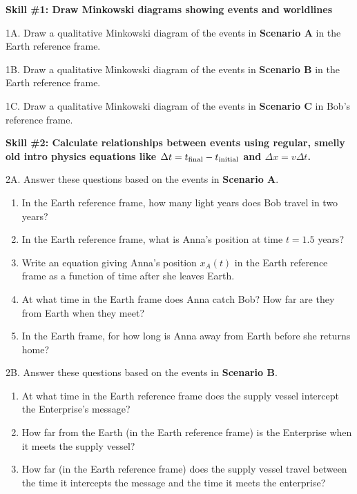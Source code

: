 \vspace{0.5 in}

\textbf{Skill \#1: Draw Minkowski diagrams showing events and worldlines}

1A. Draw a qualitative Minkowski diagram of the events in \textbf{Scenario A} in the Earth reference frame.  
\bigskip

1B. Draw a qualitative Minkowski diagram of the events in \textbf{Scenario B} in the Earth reference frame.  
\bigskip

1C. Draw a qualitative Minkowski diagram of the events in \textbf{Scenario C} in Bob's reference frame.  
\bigskip


\pagebreak


\textbf{Skill \#2: Calculate relationships between events using regular, smelly old intro physics equations like \boldmath$ \Delta t=t_{\rm final}-t_{\rm initial}$ and \boldmath${\Delta x = v \Delta t}$.}

2A. Answer these questions based on the events in \textbf{Scenario A}.
\begin{enumerate}[SkillBuilderParts]
\item In the Earth reference frame, how many light years does Bob travel in two years?
\answerspace{0.3in}

\item In the Earth reference frame, what is Anna's position at time $t=1.5$ years?
\answerspace{0.3in}

\item Write an equation giving Anna's position $x_A(t)$ in the Earth reference frame as a function of time after she leaves Earth.
\answerspace{0.3in}

\item At what time in the Earth frame does Anna catch Bob?  How far are they from Earth when they meet?
\answerspace{0.3in}

\item In the Earth frame, for how long is Anna away from Earth before she returns home?
\answerspace{0.4in}

\end{enumerate}

2B. Answer these questions based on the events in \textbf{Scenario B}.
\begin{enumerate}[SkillBuilderParts]
\item At what time in the Earth reference frame does the supply vessel intercept the Enterprise's message?
\answerspace{0.4in}

\item How far from the Earth (in the Earth reference frame) is the Enterprise when it meets the supply vessel?
\answerspace{0.4in}

\item How far (in the Earth reference frame) does the supply vessel travel between the time it intercepts the message and the time it meets the enterprise?
\answerspace{0.4in}

\end{enumerate}

